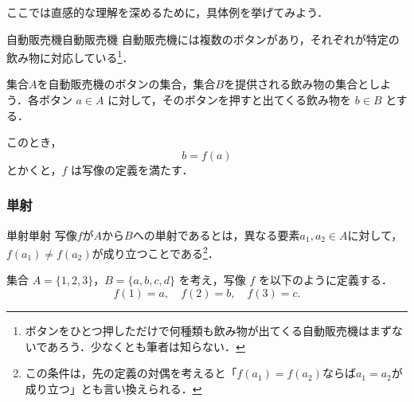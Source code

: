 \documentclass[a4paper,11pt]{ltjsarticle}
\begin{document}
        ここでは直感的な理解を深めるために，具体例を挙げてみよう．

        \begin{example}{自動販売機}{自動販売機}
          自動販売機には複数のボタンがあり，それぞれが特定の飲み物に対応している\footnote{ボタンをひとつ押しただけで何種類も飲み物が出てくる自動販売機はまずないであろう．少なくとも筆者は知らない．}．
          
          集合$A$を自動販売機のボタンの集合，集合$B$を提供される飲み物の集合としよう．各ボタン $a \in A$ に対して，そのボタンを押すと出てくる飲み物を $b \in B$ とする．

          このとき，
          \[
          b=f(a)
          \]
          とかくと，$f$ は写像の定義を満たす．
        \end{example}


\subsubsection{単射}

\begin{definition}{単射}{単射}
写像$f$が$A$から$B$への単射であるとは，異なる要素$a_1, a_2 \in A$に対して，$f(a_1) \ne f(a_2)$が成り立つことである\footnote{この条件は，先の定義の対偶を考えると「$f(a_1) =f(a_2)$ならば$a_1=a_2$が成り立つ」とも言い換えられる．}．
\end{definition}

集合 $A = \{1, 2, 3\}$，$B = \{a, b, c, d\}$ を考え，写像 $f$ を以下のように定義する．
\[
f(1) = a, \quad f(2) = b, \quad f(3) = c.
\]
\end{document}
